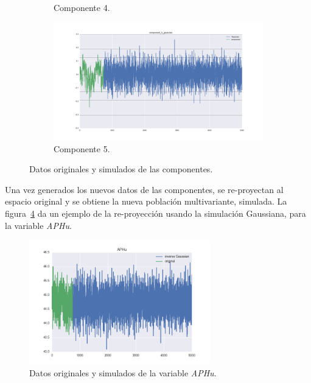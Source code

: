 \documentclass[11pt,spanish,listoffigures,listoftables]{tfgetsinf}
\begin{document}
\begin{figure}[H]
\begin{subfigure}[h]{0.49\textwidth}
            \caption{Componente 4.}
            \label{fig:component_4_gaussian}
        \end{subfigure}
        \begin{subfigure}[h]{0.49\textwidth}
            \centering
            \includegraphics[width=\textwidth]{component_5_gaussian.png}
            \caption{Componente 5.}
            \label{fig:component_5_gaussian}
        \end{subfigure}
        \caption{Datos originales y simulados de las componentes.}
        \label{fig:component_gaussian}
    \end{figure}
 
    Una vez generados los nuevos datos de las componentes, se re-proyectan al espacio original y se obtiene la nueva población multivariante, simulada. La figura~\ref{fig:inverse_gaussian_APHu} da un ejemplo de la re-proyección usando la simulación Gaussiana, para la variable {\em APHu}.
    
    \begin{figure}[H]
        \centering
        \includegraphics[width=0.7\textwidth]{inverse_gaussian_APHu.png}
        \caption{Datos originales y simulados de la variable {\em APHu}.}
        \label{fig:inverse_gaussian_APHu}
    \end{figure}       
    
\end{document}
